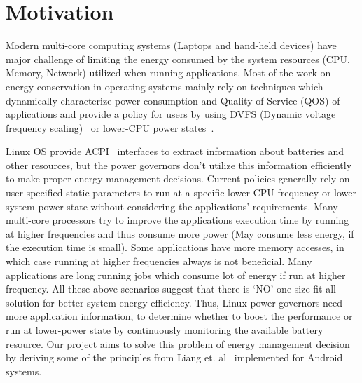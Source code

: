 \section{Motivation}\label{sec:motiv}

Modern multi-core computing systems (Laptops and hand-held devices) have major challenge of limiting the energy consumed by the system resources (CPU, Memory, Network) utilized when running applications. Most of the work on energy conservation in operating systems mainly rely on techniques which dynamically characterize power consumption and Quality of Service (QOS) of applications and provide a policy for users by using DVFS (Dynamic voltage frequency scaling)~\cite{dvfs} or lower-CPU power states~\cite{sleepscale, ecos}. 

Linux OS provide ACPI~\cite{acpi, freqgov} interfaces to extract information about batteries and other resources, but the power governors don't utilize this information efficiently to make proper energy management decisions. Current policies generally rely on user-specified static parameters to run at a specific lower CPU frequency or lower system power state without considering the applications’ requirements. Many multi-core processors try to improve the applications execution time by running at higher frequencies and thus consume more power (May consume less energy, if the execution time is small). Some applications have more memory accesses, in which case running at higher frequencies always is not beneficial. Many applications are long running jobs which consume lot of energy if run at higher frequency. All these above scenarios suggest that there is ‘NO’ one-size fit all solution for better system energy efficiency. Thus, Linux power governors need more application information, to determine whether to boost the performance or run at lower-power state by continuously monitoring the available battery resource. Our project aims to solve this problem of energy management decision by deriving some of the principles from Liang et. al~\cite{and-dvfs} implemented for Android systems.  


